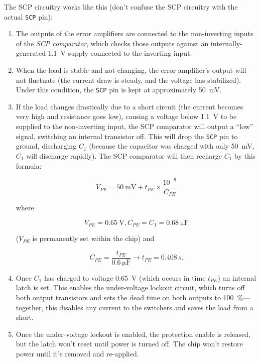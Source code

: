 \documentclass{article}
\newcommand{\chippin}{\texttt}
\begin{document}
The SCP circuitry works like this (don't confuse the SCP circuitry
with the actual \chippin{SCP} pin):

\begin{enumerate}
\item The outputs of the error amplifiers are connected to the
  non-inverting inputs of the \textit{SCP comparator}, which checks
  those outputs against an internally-generated \qty{1.1}{\volt}
  supply connected to the inverting input.
\item When the load is stable and not changing, the error amplifier's
  output will not fluctuate (the current draw is steady, and the
  voltage has stabilized). Under this condition, the \chippin{SCP} pin
  is kept at approximately \qty{50}{\milli\volt}.
\item If the load changes drastically due to a short circuit (the
  current becomes very high and resistance goes low), causing a
  voltage below \qty{1.1}{\volt} to be supplied to the non-inverting
  input, the SCP comparator will output a ``low'' signal, switching an
  internal transistor off. This will drop the \chippin{SCP} pin to
  ground, discharging $C_1$ (because the capacitor was charged with
  only \qty{50}{\milli\volt}, $C_1$ will discharge rapidly). The SCP
  comparator will then recharge $C_1$ by this formula:

\begin{displaymath}
  V_{PE} = \qty{50}{\milli\volt} + t_{PE} \times
  \frac{10^{-6}}{C_{PE}}
\end{displaymath}

\noindent
where

\begin{displaymath}
  V_{PE} = \qty{0.65}{\volt}, C_{PE} = C_1 = \qty{0.68}{\micro\farad}
\end{displaymath}

($V_{PE}$ is permanently set within the chip) and

\begin{displaymath}
  C_{PE} = \frac{t_{PE}}{\qty{0.6}{\micro\farad}}
  \rightarrow{} t_{PE} = \qty{0.408}{\second}.
\end{displaymath}

\item Once $C_1$ has charged to voltage \qty{0.65}{\volt} (which
  occurs in time $t_{PE}$) an internal latch is set. This enables the
  under-voltage lockout circuit, which turns off both output
  transistors and sets the dead time on both outputs to
  \qty{100}{\%}---together, this disables any current to the switchers
  and saves the load from a short.
\item Once the under-voltage lockout is enabled, the protection enable
  is released, but the latch won't reset until power is turned
  off. The chip won't restore power until it's removed and re-applied.
\end{enumerate}
\end{document}
